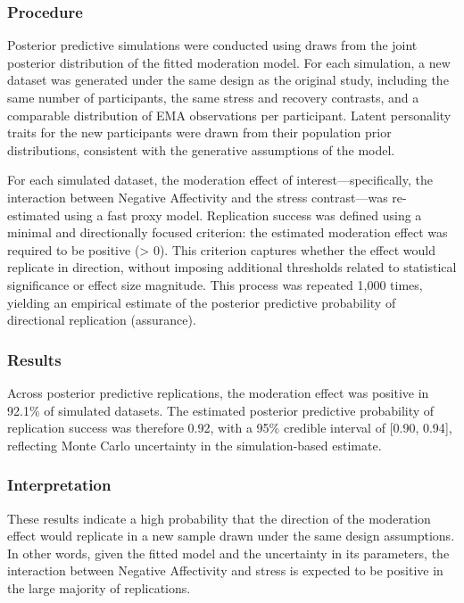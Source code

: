 \documentclass[
  english,
  man,floatsintext]{apa6}
\begin{document}
\subsubsection{Procedure}\label{procedure}

Posterior predictive simulations were conducted using draws from the joint posterior distribution of the fitted moderation model. For each simulation, a new dataset was generated under the same design as the original study, including the same number of participants, the same stress and recovery contrasts, and a comparable distribution of EMA observations per participant. Latent personality traits for the new participants were drawn from their population prior distributions, consistent with the generative assumptions of the model.

For each simulated dataset, the moderation effect of interest---specifically, the interaction between Negative Affectivity and the stress contrast---was re-estimated using a fast proxy model. Replication success was defined using a minimal and directionally focused criterion: the estimated moderation effect was required to be positive (\textgreater{} 0). This criterion captures whether the effect would replicate in direction, without imposing additional thresholds related to statistical significance or effect size magnitude. This process was repeated 1,000 times, yielding an empirical estimate of the posterior predictive probability of directional replication (assurance).

\subsubsection{Results}\label{results-2}

Across posterior predictive replications, the moderation effect was positive in 92.1\% of simulated datasets. The estimated posterior predictive probability of replication success was therefore 0.92, with a 95\% credible interval of {[}0.90, 0.94{]}, reflecting Monte Carlo uncertainty in the simulation-based estimate.

\subsubsection{Interpretation}\label{interpretation-2}

These results indicate a high probability that the direction of the moderation effect would replicate in a new sample drawn under the same design assumptions. In other words, given the fitted model and the uncertainty in its parameters, the interaction between Negative Affectivity and stress is expected to be positive in the large majority of replications.
\end{document}
